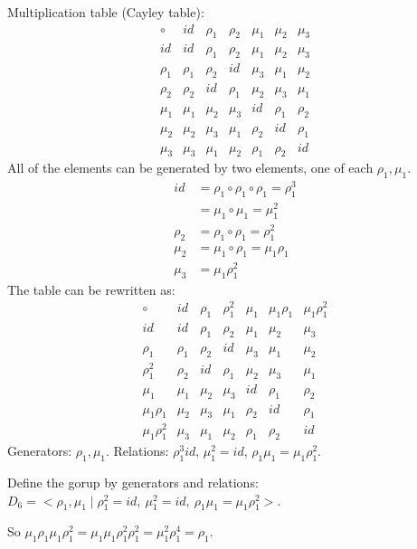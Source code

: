 \documentclass[]{article}
\begin{document}
\begin{example}
	Multiplication table (Cayley table):
	$$\begin{array}{c|cccccc}
		\circ & id & \rho_1 & \rho_2 & \mu_1 & \mu_2 & \mu_3 \\ 
		\hline
		id & id & \rho_1 & \rho_2 & \mu_1 & \mu_2 & \mu_3 \\ 
		\rho_1 & \rho_1 & \rho_2 & id & \mu_3 & \mu_1 & \mu_2 \\ 
		\rho_2 & \rho_2 & id & \rho_1 & \mu_2 & \mu_3 & \mu_1 \\ 
		\mu_1 & \mu_1 & \mu_2 & \mu_3 & id & \rho_1 & \rho_2 \\ 
		\mu_2 & \mu_2 & \mu_3 & \mu_1 & \rho_2 & id & \rho_1 \\ 
		\mu_3 & \mu_3 & \mu_1 & \mu_2 & \rho_1 & \rho_2 & id
	\end{array}$$
	All of the elements can be generated by two elements, one of each $\rho_1,\mu_1$.
	\begin{align*}
		id &= \rho_1\circ \rho_1 \circ \rho_1 = \rho_1^3 \\
		   &= \mu_1\circ\mu_1 = \mu_1^2 \\
		\rho_2 &= \rho_1\circ\rho_1 = \rho_1^2 \\
		\mu_2 &= \mu_1\circ\rho_1 = \mu_1\rho_1 \\
		\mu_3 &= \mu_1\rho_1^2
	\end{align*}
	The table can be rewritten as:
	$$\begin{array}{c|cccccc}
		\circ & id & \rho_1 & \rho_1^2 & \mu_1 & \mu_1\rho_1 & \mu_1\rho_1^2 \\
     	\hline
     	id & id & \rho_1 & \rho_2 & \mu_1 & \mu_2 & \mu_3 \\
     	\rho_1 & \rho_1 & \rho_2 & id & \mu_3 & \mu_1 & \mu_2 \\
	 	\rho_1^2 & \rho_2 & id & \rho_1 & \mu_2 & \mu_3 & \mu_1 \\
     	\mu_1 & \mu_1 & \mu_2 & \mu_3 & id & \rho_1 & \rho_2 \\
     	\mu_1\rho_1 & \mu_2 & \mu_3 & \mu_1 & \rho_2 & id & \rho_1 \\
     	\mu_1\rho_1^2 & \mu_3 & \mu_1 & \mu_2 & \rho_1 & \rho_2 & id
 	\end{array}$$
	Generators: $\rho_1,\mu_1$.
	Relations: $\rho_1^3 id$, $\mu_1^2 = id$, $\rho_1\mu_1 = \mu_1\rho_1^2$.

	Define the gorup by generators and relations: $D_6 = <\rho_1,\mu_1 \mid \rho_1^2 = id,\ \mu_1^2 = id,\ \rho_1\mu_1 = \mu_1\rho_1^2 >$.

	So $\mu_1\rho_1\mu_1\rho_1^2 = \mu_1\mu_1\rho_1^2\rho_1^2 = \mu_1^2\rho_1^4 = \rho_1$.
\end{example}
\end{document}
